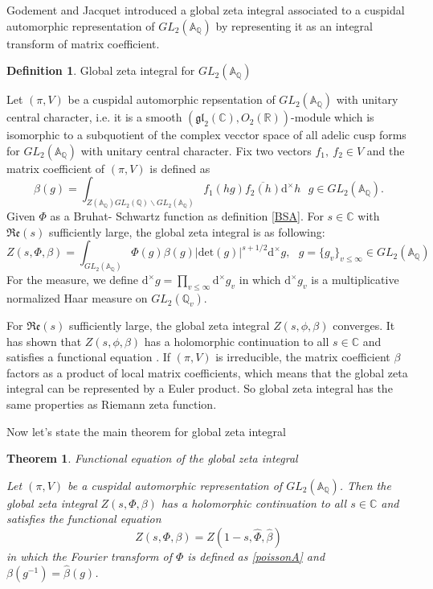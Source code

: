 \documentclass[12pt,a4paper,english]{article}
\theoremstyle{plain}
\newtheorem{thm}{Theorem}[section]
\theoremstyle{definition}
\newtheorem{defi}{Definition}
\begin{document}
 Godement and Jacquet introduced a global zeta integral associated to a cuspidal automorphic representation of $GL_{2}(\mathbb{A}_{\mathbb{Q}})$ by representing it as an integral transform of matrix coefficient. 
 \begin{defi}
 Global zeta integral for $GL_{2}(\mathbb{A}_{\mathbb{Q}})$
 
 Let $(\pi, V)$ be a cuspidal automorphic repsentation of $GL_{2}(\mathbb{A}_{\mathbb{Q}})$ with unitary central character, i.e. it is a smooth $(\mathfrak{gl}_{2}(\mathbb{C}),O_{2}(\mathbb{R}))$-module which is isomorphic to  a subquotient of the complex vecctor space of all adelic cusp forms for $GL_{2}(\mathbb{A}_{\mathbb{Q}})$ with unitary central character. Fix two vectors $f_{1},\ f_{2}\in V$ and the matrix coefficient of $(\pi, V)$ is defined as 
 \begin{equation*}
     \beta(g)=\int_{Z(\mathbb{A}_{\mathbb{Q}})GL_{2}(\mathbb{Q})\backslash GL_{2}(\mathbb{A}_{\mathbb{Q}})}f_{1}(hg)\overline{f_{2}(h)}\text{d}^{\times}h\ \ \ g\in GL_{2}(\mathbb{A}_{\mathbb{Q}}).
 \end{equation*}
 Given $\Phi$ as a Bruhat- Schwartz function as definition \ref{BSA}. For $s\in\mathbb{C}$ with $\mathfrak{Re}(s)$ sufficiently large, the global zeta integral is as following:
 \begin{equation*}
     Z(s, \Phi,\beta)=\int_{GL_{2}(\mathbb{A}_{\mathbb{Q}})}\Phi(g)\beta(g)|\text{det}(g)|^{s+1/2}\text{d}^{\times}g,\ \ \ g=\{g_{v}\}_{v\leq\infty}\in GL_{2}(\mathbb{A}_{\mathbb{Q}})
 \end{equation*}
 For the measure, we define $\text{d}^{\times}g=\prod_{v\leq\infty}\text{d}^{\times}g_{v}$ in which $\text{d}^{\times}g_{v}$ is a multiplicative normalized Haar measure on $GL_{2}(\mathbb{Q}_{v})$.
 
 \end{defi}
 
 For $\mathfrak{Re}(s)$ sufficiently large, the global zeta integral $Z(s, \phi ,\beta)$ converges. It has shown that $Z(s,\phi,\beta)$ has a holomorphic continuation to all $s\in \mathbb{C}$ and satisfies a functional equation \cite{godement2006zeta}. If $(\pi, V) $ is irreducible, the matrix coefficient $\beta$ factors as a product of local matrix coefficients, which means that the global zeta integral can be represented by a Euler product. So global zeta integral has the same properties as Riemann zeta function.
 
 Now let's state the main theorem for global zeta integral
 \begin{thm}
 Functional equation of the global zeta integral
 
 Let $(\pi,V)$ be a cuspidal automorphic representation of $GL_{2}(\mathbb{A}_{\mathbb{Q}})$. Then the global zeta integral $Z(s,\Phi,\beta)$ has a holomorphic continuation to all $s\in\mathbb{C}$ and satisfies the functional equation
 \begin{equation*}
     Z(s,\Phi, \beta)=Z(1-s,\hat{\Phi},\hat{\beta})
 \end{equation*}
 in which the Fourier transform of $\Phi$ is defined as \ref{poissonA} and $\beta(g^{-1})=\hat{\beta}(g)$.
 \end{thm}
 
\end{document}

